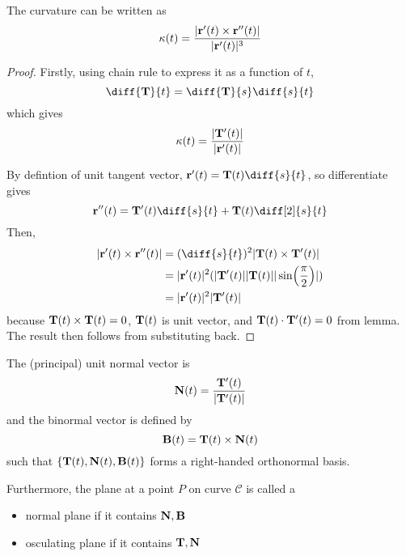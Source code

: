 \documentclass[11pt]{article}
\begin{document}
\begin{theorem}
  The curvature can be written as 
  \[\kappa(t) = \frac{|\bf{r}'(t) \times \bf{r}''(t)|}{|\bf{r}'(t)|^3}\]
\end{theorem}
\begin{proof}
  Firstly, using chain rule to express it as a function of \(t\),
  \begin{equation*}
    \diff{\bf{T}}{t} = \diff{\bf{T}}{s} \diff{s}{t}
  \end{equation*}
  which gives
  \begin{equation*}
    \kappa(t) = \frac{|\bf{T}'(t)|}{|\bf{r}'(t)|}
  \end{equation*}

  By defintion of unit tangent vector, \(\bf{r}'(t)=\bf{T}(t) \diff{s}{t}\), so differentiate gives
  \begin{equation*}
    \bf{r}''(t) = \bf{T}'(t) \diff{s}{t} + \bf{T}(t) \diff[2]{s}{t}
  \end{equation*}
  Then, 
  \begin{align*}
    |\bf{r}'(t) \times \bf{r}''(t)| 
    &= (\diff{s}{t})^2 |\bf{T}(t) \times \bf{T}'(t)| \\
    &= |\bf{r}'(t)|^2 (|\bf{T}'(t)||\bf{T}(t)| |\sin(\frac{\pi}{2})|) \\
    &= |\bf{r}'(t)|^2 |\bf{T}'(t)|
  \end{align*}
  because \(\bf{T}(t)\times \bf{T}(t) = 0\), \(\bf{T}(t)\) is unit vector, and \(\bf{T}(t) \cdot \bf{T}'(t) = 0\) from lemma.
  The result then follows from substituting back.
\end{proof}

\begin{definition}
  The (principal) unit normal vector is
  \begin{equation*}
    \bf{N}(t) = \frac{\bf{T}'(t)}{|\bf{T}'(t)|}
  \end{equation*}
  and the binormal vector is defined by
  \begin{equation*}
    \bf{B}(t) = \bf{T}(t) \times \bf{N}(t)
  \end{equation*}
  such that \(\{\bf{T}(t),\bf{N}(t),\bf{B}(t)\}\) forms a right-handed orthonormal basis.

  Furthermore, the plane at a point \(P\) on curve \(\mathcal{C}\) is called a
  \begin{itemize}
    \item normal plane if it contains \(\bf{N}, \bf{B}\)
    \item osculating plane if it contains \(\bf{T}, \bf{N}\)
  \end{itemize}
\end{definition}
\end{document}
